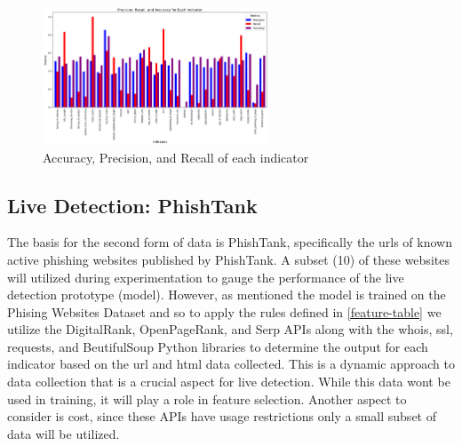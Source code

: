 \documentclass{sigkddExp}
\begin{document}
\begin{figure}[htbp]
  \centering
  \includegraphics[width=0.6\textwidth]{./images/APR.png}
  \caption{Accuracy, Precision, and Recall of each indicator}
  \label{fig:apr}
\end{figure}

\subsection{Live Detection: PhishTank}
The basis for the second form of data is PhishTank, specifically the urls of known active phishing websites published by PhishTank. A subset (10) of these websites will utilized during experimentation to gauge the performance of the live detection prototype (model). However, as mentioned the model is trained on the Phising Websites Dataset and so to apply the rules defined in \ref{feature-table} we utilize the DigitalRank, OpenPageRank, and Serp APIs along with the whois, ssl, requests, and BeutifulSoup Python libraries to determine the output for each indicator based on the url and html data collected. This is a dynamic approach to data collection that is a crucial aspect for live detection. While this data wont be used in training, it will play a role in feature selection. Another aspect to consider is cost, since these APIs have usage restrictions only a small subset of data will be utilized.
\end{document}
